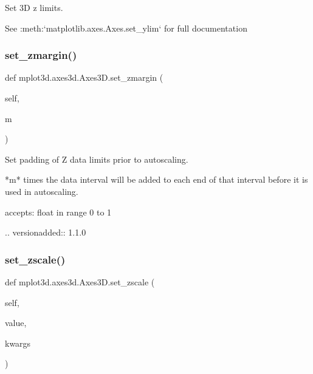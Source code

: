 \begin{DoxyVerb}
\begin{DoxyVerb}Set 3D z limits.

See :meth:`matplotlib.axes.Axes.set_ylim` for full documentation
\end{DoxyVerb}
 \mbox{\label{classmplot3d_1_1axes3d_1_1Axes3D_a558a2f1d55d04f2c95842b3ed5b4a3f1}} 
\subsubsection{\texorpdfstring{set\+\_\+zmargin()}{set\_zmargin()}}
{\footnotesize\ttfamily def mplot3d.\+axes3d.\+Axes3\+D.\+set\+\_\+zmargin (\begin{DoxyParamCaption}\item[{}]{self,  }\item[{}]{m }\end{DoxyParamCaption})}

\begin{DoxyVerb}Set padding of Z data limits prior to autoscaling.

*m* times the data interval will be added to each
end of that interval before it is used in autoscaling.

accepts: float in range 0 to 1

.. versionadded:: 1.1.0
\end{DoxyVerb}
 \mbox{\label{classmplot3d_1_1axes3d_1_1Axes3D_af02b320cbdd5e0c613d5f768c42354ff}} 
\subsubsection{\texorpdfstring{set\+\_\+zscale()}{set\_zscale()}}
{\footnotesize\ttfamily def mplot3d.\+axes3d.\+Axes3\+D.\+set\+\_\+zscale (\begin{DoxyParamCaption}\item[{}]{self,  }\item[{}]{value,  }\item[{}]{kwargs }\end{DoxyParamCaption})}


\end{DoxyVerb}
